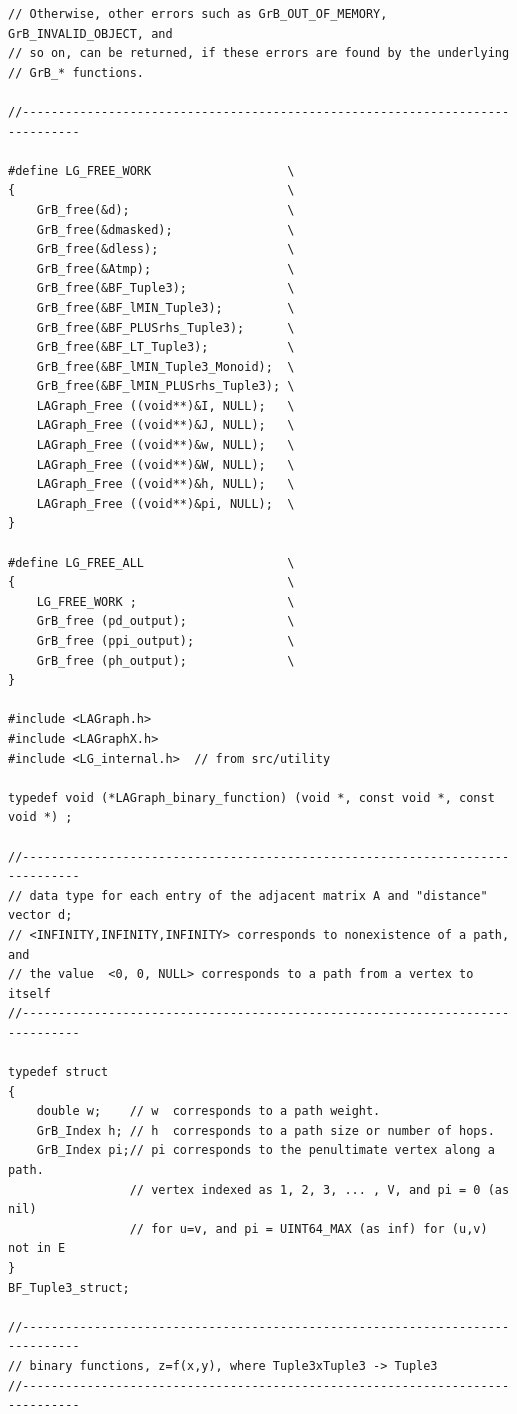 \begin{verbatim}
// Otherwise, other errors such as GrB_OUT_OF_MEMORY, GrB_INVALID_OBJECT, and
// so on, can be returned, if these errors are found by the underlying
// GrB_* functions.

//------------------------------------------------------------------------------

#define LG_FREE_WORK                   \
{                                      \
    GrB_free(&d);                      \
    GrB_free(&dmasked);                \
    GrB_free(&dless);                  \
    GrB_free(&Atmp);                   \
    GrB_free(&BF_Tuple3);              \
    GrB_free(&BF_lMIN_Tuple3);         \
    GrB_free(&BF_PLUSrhs_Tuple3);      \
    GrB_free(&BF_LT_Tuple3);           \
    GrB_free(&BF_lMIN_Tuple3_Monoid);  \
    GrB_free(&BF_lMIN_PLUSrhs_Tuple3); \
    LAGraph_Free ((void**)&I, NULL);   \
    LAGraph_Free ((void**)&J, NULL);   \
    LAGraph_Free ((void**)&w, NULL);   \
    LAGraph_Free ((void**)&W, NULL);   \
    LAGraph_Free ((void**)&h, NULL);   \
    LAGraph_Free ((void**)&pi, NULL);  \
}

#define LG_FREE_ALL                    \
{                                      \
    LG_FREE_WORK ;                     \
    GrB_free (pd_output);              \
    GrB_free (ppi_output);             \
    GrB_free (ph_output);              \
}

#include <LAGraph.h>
#include <LAGraphX.h>
#include <LG_internal.h>  // from src/utility

typedef void (*LAGraph_binary_function) (void *, const void *, const void *) ;

//------------------------------------------------------------------------------
// data type for each entry of the adjacent matrix A and "distance" vector d;
// <INFINITY,INFINITY,INFINITY> corresponds to nonexistence of a path, and
// the value  <0, 0, NULL> corresponds to a path from a vertex to itself
//------------------------------------------------------------------------------

typedef struct
{
    double w;    // w  corresponds to a path weight.
    GrB_Index h; // h  corresponds to a path size or number of hops.
    GrB_Index pi;// pi corresponds to the penultimate vertex along a path.
                 // vertex indexed as 1, 2, 3, ... , V, and pi = 0 (as nil)
                 // for u=v, and pi = UINT64_MAX (as inf) for (u,v) not in E
}
BF_Tuple3_struct;

//------------------------------------------------------------------------------
// binary functions, z=f(x,y), where Tuple3xTuple3 -> Tuple3
//------------------------------------------------------------------------------


\end{verbatim}
